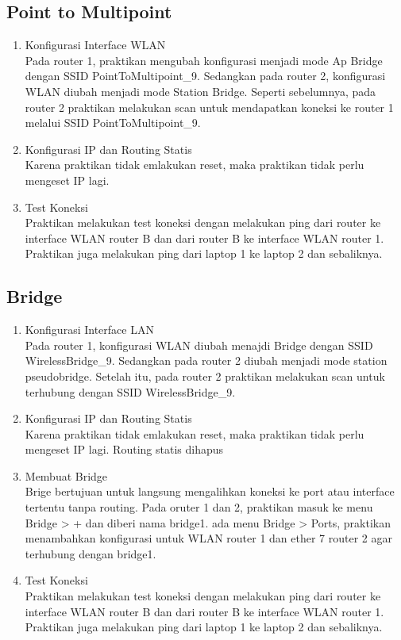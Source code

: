 \subsection{Point to Multipoint}
\begin{enumerate}
  \item Konfigurasi Interface WLAN \\
  Pada router 1, praktikan mengubah konfigurasi menjadi mode Ap Bridge dengan SSID PointToMultipoint\_9. Sedangkan pada router 2, konfigurasi WLAN diubah menjadi mode Station Bridge. Seperti sebelumnya, pada router 2 praktikan melakukan scan untuk mendapatkan koneksi ke router 1 melalui SSID PointToMultipoint\_9. 
  \item Konfigurasi IP dan Routing Statis\\
  Karena praktikan tidak emlakukan reset, maka praktikan tidak perlu mengeset IP lagi.
  \item Test Koneksi \\
  Praktikan melakukan test koneksi dengan melakukan ping dari router ke interface WLAN router B dan dari router B ke interface WLAN router 1. Praktikan juga melakukan ping dari laptop 1 ke laptop 2 dan sebaliknya.
\end{enumerate}

\subsection{Bridge}
\begin{enumerate}
  \item Konfigurasi Interface LAN \\
  Pada router 1, konfigurasi WLAN diubah menajdi Bridge dengan SSID WirelessBridge\_9. Sedangkan pada router 2 diubah menjadi mode station pseudobridge. Setelah itu, pada router 2 praktikan melakukan scan untuk terhubung dengan SSID WirelessBridge\_9. 
  \item Konfigurasi IP dan Routing Statis\\
  Karena praktikan tidak emlakukan reset, maka praktikan tidak perlu mengeset IP lagi. Routing statis dihapus
  \item Membuat Bridge \\
  Brige bertujuan untuk langsung mengalihkan koneksi ke port atau interface tertentu tanpa routing. Pada oruter 1 dan 2, praktikan masuk ke menu Bridge > + dan diberi nama bridge1. ada menu Bridge > Ports, praktikan menambahkan konfigurasi untuk WLAN router 1 dan ether 7 router 2 agar terhubung dengan bridge1. 
  \item Test Koneksi \\
  Praktikan melakukan test koneksi dengan melakukan ping dari router ke interface WLAN router B dan dari router B ke interface WLAN router 1. Praktikan juga melakukan ping dari laptop 1 ke laptop 2 dan sebaliknya.
\end{enumerate}

